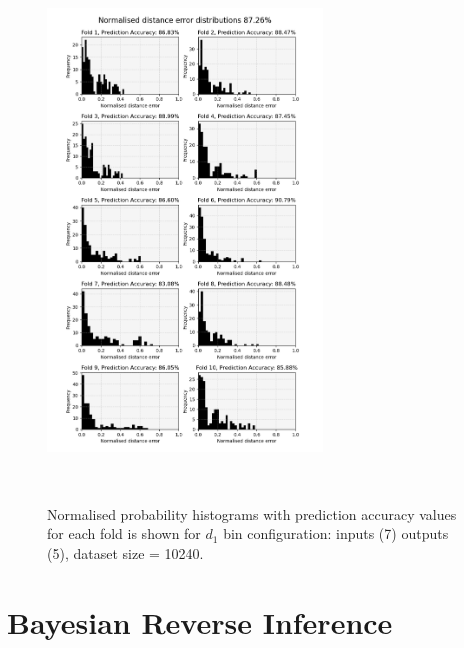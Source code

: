 \begin{figure}[h!]
    \centering
    \includegraphics[width=0.65\textwidth]{figures/validation_plots/TE/k-fold_two_outputs.png}
    \caption{\small Normalised probability histograms with prediction accuracy values for each fold is shown for $d_{1}$ bin configuration: inputs (7) outputs (5), dataset size = 10240.}~\label{fig:k-foldhistogramsTE}
\end{figure}

\newpage
\section{Bayesian Reverse Inference}



